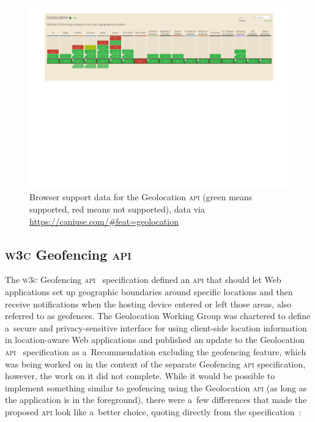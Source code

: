\documentclass[sigconf,hyphens]{acmart}
\begin{document}
\begin{figure}[h]
  \includegraphics[width=\linewidth,trim=2.5cm 17.5cm 2.5cm 0cm]{caniuse.pdf}
  \caption{Browser support data for the Geolocation \textsc{api} (green means supported, red means not supported),
    data via \url{https://caniuse.com/\#feat=geolocation}}
  \label{fig:caniuse}
\end{figure}

\subsection{\textsc{w3c} Geofencing \textsc{api}}

The \textsc{w3c} Geofencing \textsc{api}~\cite{kruisselbrink2017geofencing} specification
defined an \textsc{api} that should let Web applications set up geographic boundaries
around specific locations and then receive notifications when the hosting device
entered or left those areas, also referred to as geofences.
The Geolocation Working Group was chartered to define a~secure and privacy-sensitive interface
for using client-side location information in location-aware Web applications
and published an update to the Geolocation \textsc{api}~\cite{popescu2016geolocation}
specification as a~Recommendation excluding the geofencing feature,
which was being worked on in the context of the separate Geofencing \textsc{api} specification,
however, the work on it did not complete.
While it would be possible to implement something similar to geofencing using the Geolocation
\textsc{api} (as long as the application is in the foreground),
there were a~few differences that made the proposed \textsc{api} look like a~better choice,
quoting directly from the specification~\cite{kruisselbrink2017geofencing}:
\end{document}
